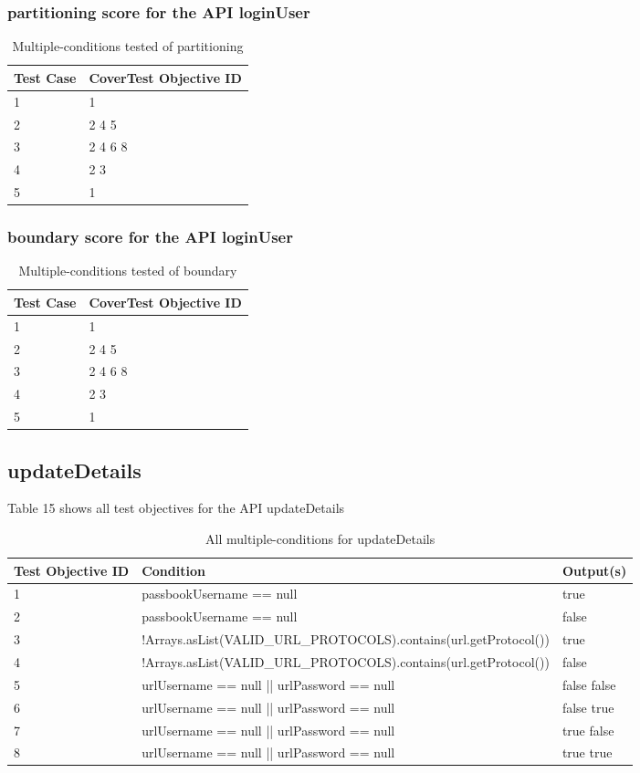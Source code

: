 \documentclass{article}
\begin{document}
\subsubsection{partitioning score for the API loginUser}
\begin{longtable}{|p{2cm}|p{8cm}|}
\caption{Multiple-conditions tested of partitioning}\\
\hline 
Test Case& CoverTest Objective ID\\
\hline  
1&1\\
\hline
2&2 4 5\\
\hline
3&2 4 6 8\\
\hline
4&2 3\\
\hline
5&1\\
\hline
\end{longtable}
\subsubsection{boundary score for the API loginUser}
\begin{longtable}{|p{2cm}|p{8cm}|}
\caption{Multiple-conditions tested of boundary}\\
\hline 
Test Case& CoverTest Objective ID\\
\hline  
1&1\\
\hline
2&2 4 5\\
\hline
3&2 4 6 8\\
\hline
4&2 3\\
\hline
5&1\\
\hline
\end{longtable}
\subsection{updateDetails}
Table 15 shows all test objectives for the API updateDetails
\begin{longtable}{|p{2cm}|p{11cm}|p{2cm}|}
\caption{All multiple-conditions for updateDetails}\\
\hline 
Test Objective ID&Condition&Output(s)\\
\hline  
1&passbookUsername == null&true\\
\hline
2&passbookUsername == null&false\\
\hline
3&!Arrays.asList(VALID\_URL\_PROTOCOLS).contains(url.getProtocol())&true\\
\hline
4&!Arrays.asList(VALID\_URL\_PROTOCOLS).contains(url.getProtocol())&false\\
\hline
5&urlUsername == null || urlPassword == null&false false\\
\hline
6&urlUsername == null || urlPassword == null&false true\\
\hline
7&urlUsername == null || urlPassword == null&true false\\
\hline
8&urlUsername == null || urlPassword == null&true true\\
\hline
\end{longtable}
\end{document}
